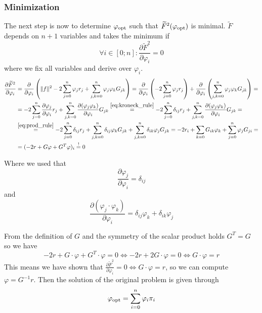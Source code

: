 \subsubsection{Minimization}
The next step is now to determine \(\varphi_{\operatorname{opt}}\) such that \(\widetilde{F}^2(\varphi_{\operatorname{opt}})\) is minimal.
\(\widetilde{F}\) depends on \(n+1\) variables and takes the minimum if
\[\forall i \in [0;n]: \frac{\partial\widetilde{F}^2}{\partial \varphi_i} = 0\]
where we fix all variables and derive over \(\varphi_i\).
\begin{equation*}
   \begin{split}
      \frac{\partial\widetilde{F}^2}{\partial \varphi_i} & = \frac{\partial}{\partial \varphi_i} \left(\|f\|^2 - 2 \sum_{j=0}^n \varphi_jr_j + \sum_{j,k = 0}^n \varphi_j\varphi_k G_{jk}\right) = \frac{\partial}{\partial \varphi_i} \left(-2 \sum_{j=0}^n \varphi_jr_j\right) + \frac{\partial}{\partial \varphi_i} \left(\sum_{j,k = 0}^n \varphi_j\varphi_k G_{jk}\right) =\\
                                                   & = -2 \sum_{j=0}^n \frac{\partial \varphi_j}{\partial \varphi_i} r_j + \sum_{j,k=0}^n \frac{\partial (\varphi_j \varphi_k)}{\partial \varphi_i} G_{jk} \overset{\cref{eq:kroneck_rule}}{=} -2 \sum_{j=0}^n \delta_{ij} r_j + \sum_{j,k=0}^n \frac{\partial (\varphi_j \varphi_k)}{\partial \varphi_i} G_{jk} = \\
                                                   & \overset{\cref{eq:prod_rule}}{=} -2 \sum_{j=0}^n \delta_{ij} r_j + \sum_{j,k=0}^n \delta_{ij}\varphi_k G_{jk} + \sum_{j,k=0}^n \delta_{ik}\varphi_j G_{jk} = -2 r_i + \sum_{k=0} G_{ik} \varphi_k + \sum_{j=0}^n \varphi_j G_{ji} = \\
                                                   & = (-2r + G\varphi + G^T\varphi)_i \overset{!}{=} 0
   \end{split}
\end{equation*}

Where we used that
\begin{equation}\label{eq:kroneck_rule}
   \frac{\partial \varphi_j}{\partial \varphi_i} = \delta_{ij}
\end{equation}
and
\begin{equation}\label{eq:prod_rule}
   \frac{\partial (\varphi_j \cdot \varphi_k)}{\partial \varphi_i} = \delta_{ij}\varphi_k + \delta_{ik}\varphi_j
\end{equation}

From the definition of \(G\) and the symmetry of the scalar product holds \(G^T = G\) so we have
\[-2r + G \cdot \varphi + G^T \cdot \varphi = 0 \iff -2r + 2G\cdot\varphi = 0 \iff G \cdot \varphi = r\]
This means we have shown that \(\frac{\partial \widetilde{F}^2}{\partial \varphi_i} = 0 \iff G \cdot \varphi = r\), so we can compute \(\varphi = G^{-1}r\).
Then the solution of the original problem is given through
\[\varphi_{\operatorname{opt}} = \sum_{i=0}^n \varphi_i \pi_i\]

